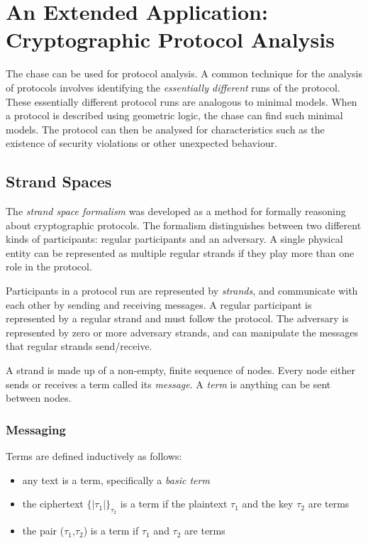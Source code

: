 \section{An Extended Application: \\ Cryptographic Protocol Analysis}

	The chase can be used for protocol analysis. A common technique for the analysis
	of protocols involves identifying the \emph{essentially different} runs of
	the protocol. These essentially different protocol runs are analogous to
	minimal models. When a protocol is described using geometric logic, the
	chase can find such minimal models. The protocol can then be analysed for
	characteristics such as the existence of security violations or other
	unexpected behaviour.

	\subsection{Strand Spaces}

		The \emph{strand space formalism} was developed as a method for
		formally reasoning about cryptographic protocols. The formalism
		distinguishes between two different kinds of participants: regular
		participants and an adversary. A single physical entity can be
		represented as multiple regular strands if they play more than one role
		in the protocol.

		Participants in a protocol run are represented by \emph{strands}, and
		communicate with each other by sending and receiving messages. A
		regular participant is represented by a regular strand and must follow
		the protocol. The adversary is represented by zero or more adversary
		strands, and can manipulate the messages that regular strands
		send/receive.

		A strand is made up of a non-empty, finite sequence of nodes. Every
		node either sends or receives a term called its \emph{message}. A
		\emph{term} is anything can be sent between nodes.

		\subsubsection{Messaging}

			Terms are defined inductively as follows:

			\begin{itemize}
			\item any text is a term, specifically a \emph{basic term}
			\item the ciphertext $\{|\tau_1|\}_{\tau_2}$ is a term if the plaintext $\tau_1$ and the key $\tau_2$ are terms
			\item the pair ($\tau_1$,$\tau_2$) is a term if $\tau_1$ and $\tau_2$ are terms
			\end{itemize}

